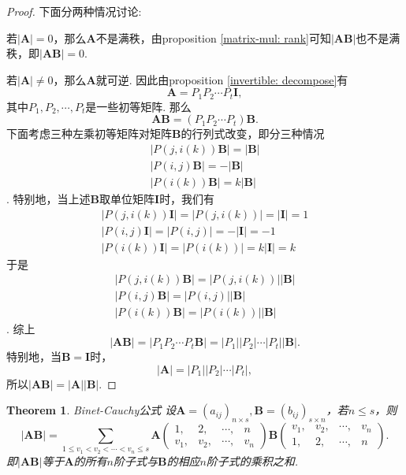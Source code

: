 \documentclass{article}
\newtheorem{theorem}{Theorem}[section]
\newcommand{\mbf}[1]{\bm{#1}}
\begin{document}
\begin{proof}
下面分两种情况讨论:

若$|\mbf{A}| = 0$，那么$\mbf{A}$不是满秩，由proposition \ref{matrix-mul: rank}可知$|\mbf{A}\mbf{B}|$也不是满秩，即$|\mbf{A}\mbf{B}| = 0$.

若$|\mbf{A}| \neq 0$，那么$\mbf{A}$就可逆. 因此由proposition \ref{invertible: decompose}有
$$
\mbf{A} = P_1P_2\cdots P_t\mbf{I}, 
$$
其中$P_1,P_2,\cdots,P_t$是一些初等矩阵. 那么
$$
\mbf{A}\mbf{B} = (P_1P_2\cdots P_t)\mbf{B}.
$$
下面考虑三种左乘初等矩阵对矩阵$\mbf{B}$的行列式改变，即分三种情况
$$
\begin{array}{ll}
|P(j,i(k))\mbf{B}| = |\mbf{B}|\\
|P(i,j)\mbf{B}| = -|\mbf{B}| \\
|P(i(k))\mbf{B}| = k|\mbf{B}|
\end{array}
$$.
特别地，当上述$\mbf{B}$取单位矩阵$\mbf{I}$时，我们有
$$
\begin{array}{ll}
|P(j,i(k))\mbf{I}| = |P(j,i(k))| = |\mbf{I}| = 1\\
|P(i,j)\mbf{I}| = |P(i,j)| = -|\mbf{I}| = -1 \\
|P(i(k))\mbf{I}| = |P(i(k))| =k|\mbf{I}| = k
\end{array}
$$
于是
$$
\begin{array}{ll}
|P(j,i(k))\mbf{B}| =|P(j,i(k))| |\mbf{B}|\\
|P(i,j)\mbf{B}| = |P(i,j)||\mbf{B}| \\
|P(i(k))\mbf{B}| = |P(i(k))||\mbf{B}|
\end{array}
$$. 综上
$$
|\mbf{A}\mbf{B}| = |P_1P_2\cdots P_t\mbf{B}| = |P_1||P_2|\cdots |P_t||\mbf{B}|.
$$
特别地，当$\mbf{B} = \mbf{I}$时，
$$
|\mbf{A}| = |P_1||P_2|\cdots |P_t|,
$$
所以$|\mbf{A}\mbf{B}| = |\mbf{A}||\mbf{B}|$.
\end{proof}

\begin{theorem}
\rm {\color{red} Binet-Cauchy公式} 设$\mbf{A} = (a_{ij})_{n \times s},\mbf{B} = (b_{ij})_{s \times n}$，若$n \leq s$，则
$$
|\mbf{A}\mbf{B}| = \sum\limits_{1\leq v_1 < v_2 < \cdots <v_n \leq s} \mbf{A} \begin{pmatrix}
1,&2,&\cdots,&n \\
v_1,&v_2,&\cdots,&v_n
\end{pmatrix}\mbf{B} \begin{pmatrix}
v_1,&v_2,&\cdots,&v_n \\
1,&2,&\cdots,&n 
\end{pmatrix}.
$$
即$|\mbf{A}\mbf{B}|$等于$\mbf{A}$的所有$n$阶子式与$\mbf{B}$的相应$n$阶子式的乘积之和.
\end{theorem}
\end{document}
